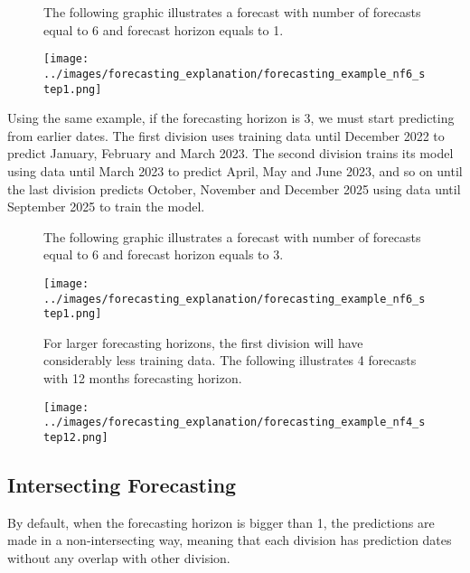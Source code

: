 \begin{figure}[H]
The following graphic illustrates a forecast with number of forecasts equal to 6 and forecast horizon equals to 1.

    \begin{center}
        \texttt{[image: ../images/forecasting\_explanation/forecasting\_example\_nf6\_step1.png]}
    \end{center}
\end{figure}

Using the same example, if the forecasting horizon is 3, we must start predicting from earlier dates. The first division uses training data until December 2022 to predict January, February and March 2023. The second division trains its model using data until March 2023 to predict April, May and June 2023, and so on until the last division predicts October, November and December 2025 using data until September 2025 to train the model.

\begin{figure}[H]
The following graphic illustrates a forecast with number of forecasts equal to 6 and forecast horizon equals to 3.

    \begin{center}
        \texttt{[image: ../images/forecasting\_explanation/forecasting\_example\_nf6\_step1.png]}
    \end{center}
\end{figure}

\begin{figure}[H]
For larger forecasting horizons, the first division will have considerably less training data. The following illustrates 4 forecasts with 12 months forecasting horizon.

    \begin{center}
        \texttt{[image: ../images/forecasting\_explanation/forecasting\_example\_nf4\_step12.png]}
    \end{center}
\end{figure}

\subsection{Intersecting Forecasting}

By default, when the forecasting horizon is bigger than 1, the predictions are made in a non-intersecting way, meaning that each division has prediction dates without any overlap with other division.

